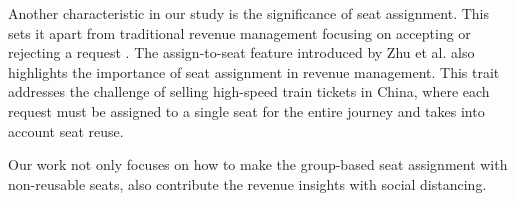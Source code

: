 Another characteristic in our study is the significance of seat assignment. This sets it apart from traditional revenue management focusing on accepting or rejecting a request \cite{gallego1997multiproduct}. The assign-to-seat feature introduced by Zhu et al. \cite{zhu2023assign} also highlights the importance of seat assignment in revenue management. This trait addresses the challenge of selling high-speed train tickets in China, where each request must be assigned to a single seat for the entire journey and takes into account seat reuse.


Our work not only focuses on how to make the group-based seat assignment with non-reusable seats, also contribute the revenue insights with social distancing.












